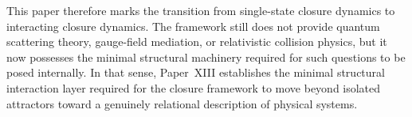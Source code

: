 \documentclass[12pt]{article}
\begin{document}
This paper therefore marks the transition from single-state closure dynamics to interacting closure dynamics. The framework still does not provide quantum scattering theory, gauge-field mediation, or relativistic collision physics, but it now possesses the minimal structural machinery required for such questions to be posed internally. In that sense, Paper~XIII establishes the minimal structural interaction layer required for the closure framework to move beyond isolated attractors toward a genuinely relational description of physical systems.



\end{document}
